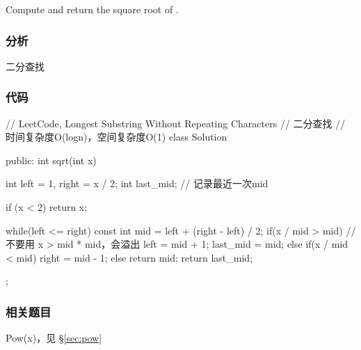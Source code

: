 Compute and return the square root of .


\subsubsection{分析}
二分查找


\subsubsection{代码}
\begin{Code}
// LeetCode, Longest Substring Without Repeating Characters
// 二分查找
// 时间复杂度O(logn)，空间复杂度O(1)
class Solution {
public:
    int sqrt(int x) {
        int left = 1, right = x / 2;
        int last_mid;  // 记录最近一次mid

        if (x < 2) return x;

        while(left <= right) {
            const int mid = left + (right - left) / 2;
            if(x / mid > mid) { // 不要用 x > mid * mid，会溢出
                left = mid + 1;
                last_mid = mid;
            } else if(x / mid < mid) {
                right = mid - 1;
            } else {
                return mid;
            }
        }
        return last_mid;
    }
};
\end{Code}


\subsubsection{相关题目}
\begindot
\item Pow(x)，见 \S \ref{sec:pow}
\myenddot
